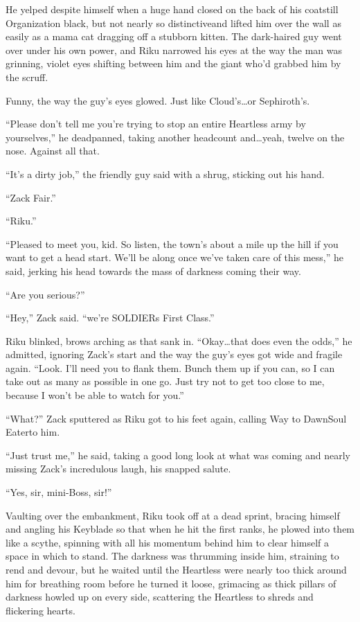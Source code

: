 He yelped despite himself when a huge hand closed on the back of his coat\textemdash still Organization black, but not nearly so distinctive\textemdash and lifted him over the wall as easily as a mama cat dragging off a stubborn kitten. The dark-haired guy went over under his own power, and Riku narrowed his eyes at the way the man was grinning, violet eyes shifting between him and the giant who'd grabbed him by the scruff.

Funny, the way the guy's eyes glowed. Just like Cloud's\ldots or Sephiroth's.

``Please don't tell me you're trying to stop an entire Heartless army by yourselves,'' he deadpanned, taking another headcount and\ldots yeah, twelve on the nose. Against all that.

``It's a dirty job,'' the friendly guy said with a shrug, sticking out his hand. 

``Zack Fair.''

``Riku.''

``Pleased to meet you, kid. So listen, the town's about a mile up the hill if you want to get a head start. We'll be along once we've taken care of this mess,'' he said, jerking his head towards the mass of darkness coming their way.

``Are you serious?''

``Hey,'' Zack said. ``we're SOLDIERs First Class.''

Riku blinked, brows arching as that sank in. ``Okay\ldots that does even the odds,'' he admitted, ignoring Zack's start and the way the guy's eyes got wide and fragile again. ``Look. I'll need you to flank them. Bunch them up if you can, so I can take out as many as possible in one go. Just try not to get too close to me, because I won't be able to watch for you.''

``What?'' Zack sputtered as Riku got to his feet again, calling Way to Dawn\textemdash Soul Eater\textemdash to him.

``Just trust me,'' he said, taking a good long look at what was coming and nearly missing Zack's incredulous laugh, his snapped salute.

``Yes, sir, mini-Boss, sir!''

Vaulting over the embankment, Riku took off at a dead sprint, bracing himself and angling his Keyblade so that when he hit the first ranks, he plowed into them like a scythe, spinning with all his momentum behind him to clear himself a space in which to stand. The darkness was thrumming inside him, straining to rend and devour, but he waited until the Heartless were nearly too thick around him for breathing room before he turned it loose, grimacing as thick pillars of darkness howled up on every side, scattering the Heartless to shreds and flickering hearts.

